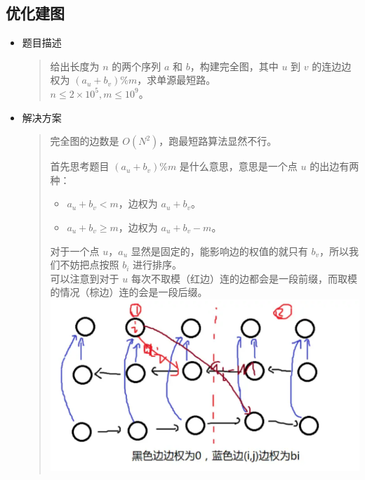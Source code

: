 \documentclass[a4paper,12pt]{article}
\begin{document}
\subsection{优化建图}

\begin{itemize}
    \item 题目描述
    \begin{quote}
        给出长度为 \(n\) 的两个序列 \(a\) 和 \(b\)，构建完全图，其中 \(u\) 到
        \(v\) 的连边边权为 \((a_u + b_v)\% m\)，求单源最短路。\\
        
        \(n \leq 2 \times 10^5, m \leq 10^9\)。        
    \end{quote}
    \item 解决方案
    \begin{quote}
        完全图的边数是 \(O(N^2)\)，跑最短路算法显然不行。

        首先思考题目 \((a_u+b_v)\%m\) 是什么意思，意思是一个点 \(u\)
        的出边有两种：
        
        \begin{itemize}
        \item
          \(a_u + b_v < m\)，边权为 \(a_u + b_v\)。
        \item
          \(a_u+b_v \geq m\)，边权为 \(a_u+b_v-m\)。
        \end{itemize}
        
        对于一个点 \(u\)，\(a_u\) 显然是固定的，能影响边的权值的就只有
        \(b_v\)，所以我们不妨把点按照 \(b_i\) 进行排序。 \\
        
        可以注意到对于 \(u\)
        每次不取模（红边）连的边都会是一段前缀，而取模的情况（棕边）连的会是一段后缀。\\
        
        \includegraphics[scale=0.8]{优化建图1.png}        
        

\end{quote}
\end{itemize}
\end{document}
